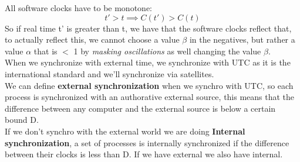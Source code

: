 \documentclass[11pt, a4paper]{article}
\begin{document}
All software clocks have to be monotone:
$$ t' > t \implies C(t') > C(t)$$
So if real time t' is greater than t, we have that the software clocks reflect that, to actually reflect this, we cannot choose a value $\beta$ in the negatives, but rather
a value $\alpha$ that is $<$ 1 by \textit{masking oscillations} as well changing the value $\beta$.\\
When we synchronize with external time, we synchronize with UTC as it is the international standard and we'll synchronize via satellites.\\
We can define \textbf{external synchronization} when we synchro with UTC, so each process is synchronized with an authorative external source, this means that the difference between any computer and the external source is below a certain bound D.\\
If we don't synchro with the external world we are doing \textbf{Internal synchronization}, a set of processes is internally synchronized if the difference between their clocks is less than D. If we have external we also have internal.
\end{document}
